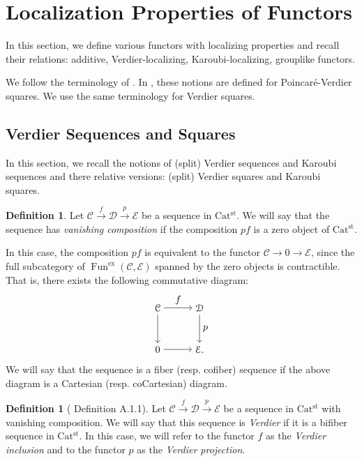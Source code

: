 \documentclass[a4paper,dvipdfmx,11pt,reqno]{amsart}
\DeclareMathOperator{\Fun}{Fun}
\newcommand{\C}{\mathcal{C}}
\newcommand{\D}{\mathcal{D}}
\newcommand{\E}{\mathcal{E}}
\newcommand{\Catst}{\mathrm{Cat^{st}}}
\theoremstyle{definition}
\newtheorem{definition}[theorem]{Definition}
\begin{document}
\section{Localization Properties of Functors} \label{sec.localization_properties}

In this section, we define various functors with localizing properties and recall their relations: 
additive, Verdier-localizing, Karoubi-localizing, grouplike functors.

We follow the terminology of \cite{CDH23}.
In \cite{CDH23}, these notions are defined for Poincar\'{e}-Verdier squares. 
We use the same terminology for Verdier squares.

\subsection{Verdier Sequences and Squares}

In this section, we recall the notions of (split) Verdier sequences and Karoubi sequences and there relative versions: (split) Verdier squares and Karoubi squares.

\begin{definition} \label{CDH23.rem.A.1.2}
  Let $\C \xrightarrow{f} \D \xrightarrow{p} \E$ be a sequence in $\Catst$.
  We will say that the sequence has \textit{vanishing composition} if the composition $pf$ is a zero object of $\Catst$.
  
  In this case, the composition $pf$ is equivalent to the functor $\C \to 0 \to \E$, since the full subcategory of $\Fun^{\mathrm{ex}}(\C,\E)$ spanned by the zero objects is contractible.
  That is, there exists the following commutative diagram:
  \[\begin{tikzpicture}[auto,->] 
    \node (tl) at (0,1.5) {$\C$}; 
    \node (tr) at (1.5,1.5) {$\D$};
    \node (bl) at (0,0) {$0$}; 
    \node (br) at (1.5,0) {$\E.$}; 
    \draw (tl) -- node {$f$} (tr); 
    \draw (bl) -- node[swap] {} (br); 
    \draw (tl) -- node[swap] {} (bl);
    \draw (tr) -- node {$p$} (br); 
  \end{tikzpicture}\]
  We will say that the sequence is a fiber (resp. cofiber) sequence if the above diagram is a Cartesian (resp. coCartesian) diagram.
\end{definition}

\begin{definition}[\cite{CDH23} Definition A.1.1] \label{CDH23.def.A.1.1}
  Let $\C \xrightarrow{f} \D \xrightarrow{p} \E$ be a sequence in $\Catst$ with vanishing composition.
  We will say that this sequence is \textit{Verdier} if it is a bifiber sequence in $\Catst$.
  In this case, we will refer to the functor $f$ as the \textit{Verdier inclusion} and to the functor $p$ as the \textit{Verdier projection}.
\end{definition}
\end{document}

